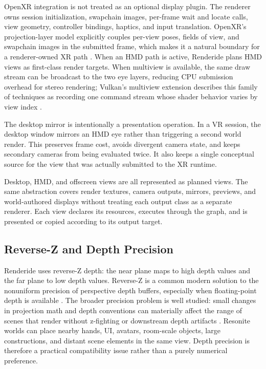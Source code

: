 \documentclass[acmtog,screen,nonacm]{acmart}
\begin{document}
OpenXR integration is not treated as an optional display plugin. The renderer owns session initialization, swapchain images, per-frame wait and locate calls, view geometry, controller bindings, haptics, and input translation. OpenXR's projection-layer model explicitly couples per-view poses, fields of view, and swapchain images in the submitted frame, which makes it a natural boundary for a renderer-owned XR path \citep{openxrSpec,openxrTutorialGraphics}. When an HMD path is active, Renderide plans HMD views as first-class render targets. When multiview is available, the same draw stream can be broadcast to the two eye layers, reducing CPU submission overhead for stereo rendering; Vulkan's multiview extension describes this family of techniques as recording one command stream whose shader behavior varies by view index \citep{vulkanMultiview}.

The desktop mirror is intentionally a presentation operation. In a VR session, the desktop window mirrors an HMD eye rather than triggering a second world render. This preserves frame cost, avoids divergent camera state, and keeps secondary cameras from being evaluated twice. It also keeps a single conceptual source for the view that was actually submitted to the XR runtime.

Desktop, HMD, and offscreen views are all represented as planned views. The same abstraction covers render textures, camera outputs, mirrors, previews, and world-authored displays without treating each output class as a separate renderer. Each view declares its resources, executes through the graph, and is presented or copied according to its output target.

\subsection{Reverse-Z and Depth Precision}

Renderide uses reverse-Z depth: the near plane maps to high depth values and the far plane to low depth values. Reverse-Z is a common modern solution to the nonuniform precision of perspective depth buffers, especially when floating-point depth is available \citep{reed2021depth}. The broader precision problem is well studied: small changes in projection math and depth conventions can materially affect the range of scenes that render without z-fighting or downstream depth artifacts \citep{upchurch2012depth}. Resonite worlds can place nearby hands, UI, avatars, room-scale objects, large constructions, and distant scene elements in the same view. Depth precision is therefore a practical compatibility issue rather than a purely numerical preference.
\end{document}
